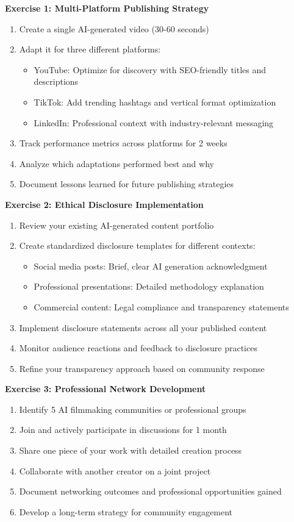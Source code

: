 \textbf{Exercise 1: Multi-Platform Publishing Strategy}
\begin{enumerate}
\item Create a single AI-generated video (30-60 seconds)
\item Adapt it for three different platforms:
   \begin{itemize}
   \item YouTube: Optimize for discovery with SEO-friendly titles and descriptions
   \item TikTok: Add trending hashtags and vertical format optimization
   \item LinkedIn: Professional context with industry-relevant messaging
   \end{itemize}
\item Track performance metrics across platforms for 2 weeks
\item Analyze which adaptations performed best and why
\item Document lessons learned for future publishing strategies
\end{enumerate}

\textbf{Exercise 2: Ethical Disclosure Implementation}
\begin{enumerate}
\item Review your existing AI-generated content portfolio
\item Create standardized disclosure templates for different contexts:
   \begin{itemize}
   \item Social media posts: Brief, clear AI generation acknowledgment
   \item Professional presentations: Detailed methodology explanation
   \item Commercial content: Legal compliance and transparency statements
   \end{itemize}
\item Implement disclosure statements across all your published content
\item Monitor audience reactions and feedback to disclosure practices
\item Refine your transparency approach based on community response
\end{enumerate}

\textbf{Exercise 3: Professional Network Development}
\begin{enumerate}
\item Identify 5 AI filmmaking communities or professional groups
\item Join and actively participate in discussions for 1 month
\item Share one piece of your work with detailed creation process
\item Collaborate with another creator on a joint project
\item Document networking outcomes and professional opportunities gained
\item Develop a long-term strategy for community engagement
\end{enumerate}

